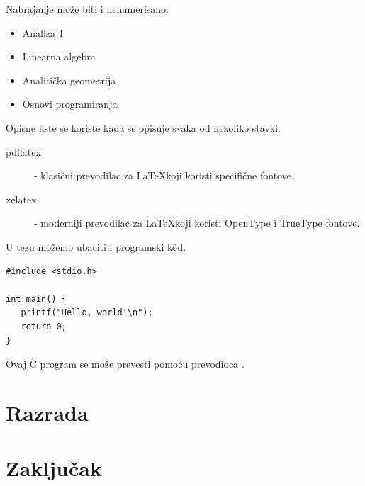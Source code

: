 \documentclass[12pt,oneside]{memoir}
\begin{document}
Nabrajanje može biti i nenumerisano:

\begin{itemize}
\item Analiza 1
\item Linearna algebra
\item Analitička geometrija
\item Osnovi programiranja
\end{itemize}

Opisne liste se koriste kada se opisuje svaka od nekoliko stavki.

\begin{description}
\item[pdflatex] - klasični prevodilac za \LaTeX koji koristi specifične fontove.
\item[xelatex] - moderniji prevodilac za \LaTeX koji koristi
  OpenType i TrueType fontove.
\end{description}


U tezu možemo ubaciti i programski kôd.

\begin{lstlisting}
#include <stdio.h>

int main() {
   printf("Hello, world!\n");
   return 0;
}
\end{lstlisting}

Ovaj C program se može prevesti pomoću prevodioca \cite{gcc}.

\pangrami

\chapter{Razrada}
\label{chp:razrada}


\pangrami

\pangrami

\chapter{Zaključak}
\pangrami

\pangrami
\end{document}
